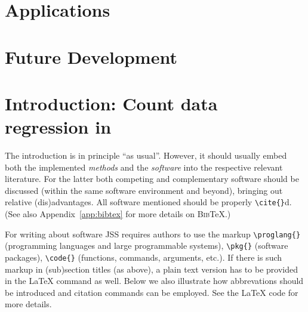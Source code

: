\documentclass[article]{jss}
\begin{document}
\section[Application]{Applications}

\section[Future]{Future Development}









\section[Introduction: Count data regression in R]{Introduction: Count data regression in } \label{sec:intro}

\begin{leftbar}
The introduction is in principle ``as usual''. However, it should usually embed
both the implemented \emph{methods} and the \emph{software} into the respective
relevant literature. For the latter both competing and complementary software
should be discussed (within the same software environment and beyond), bringing
out relative (dis)advantages. All software mentioned should be properly
\verb|\cite{}|d. (See also Appendix~\ref{app:bibtex} for more details on
\textsc{Bib}{\TeX}.)

For writing about software JSS requires authors to use the markup
\verb|\proglang{}| (programming languages and large programmable systems),
\verb|\pkg{}| (software packages), \verb|\code{}| (functions, commands,
arguments, etc.). If there is such markup in (sub)section titles (as above), a
plain text version has to be provided in the {\LaTeX} command as well. Below we
also illustrate how abbrevations should be introduced and citation commands can
be employed. See the {\LaTeX} code for more details.
\end{leftbar}
\end{document}
